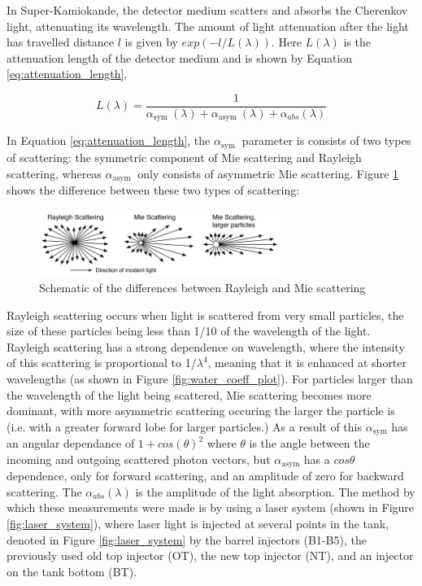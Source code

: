 In Super-Kamiokande, the detector medium scatters and absorbs the Cherenkov light, attenuating its wavelength. The amount of light attenuation after the light has travelled distance $l$ is given by $exp(-l/L(\lambda))$. Here $L(\lambda)$ is the attenuation length of the detector medium and is shown by Equation \ref{eq:attenuation_length}, 

\begin{equation}
L(\lambda)=\frac{1}{\alpha_{\text {sym }}(\lambda)+\alpha_{\text {asym }}(\lambda)+\alpha_{a b s}(\lambda)}
\label{eq:attenuation_length}
\end{equation}

In Equation \ref{eq:attenuation_length}, the $\alpha_{\text {sym }}$ parameter is consists of two types of scattering: the symmetric component of Mie scattering and Rayleigh scattering, whereas $\alpha_{\text {asym }}$ only consists of asymmetric Mie scattering.   Figure \ref{fig:rayleigh_mie} shows the difference between these two types of scattering:

\begin{figure}
    \centering
    \includegraphics[width=0.7\textwidth]{Figures/rayleigh_mie.png}
    \caption{Schematic of the differences between Rayleigh and Mie scattering}
    \label{fig:rayleigh_mie}
\end{figure}

Rayleigh scattering occurs when light is scattered from very small particles, the size of these particles being less than 1/10 of the wavelength of the light. Rayleigh scattering has a strong dependence on wavelength, where the intensity of this scattering is proportional to 1/$\lambda^{4}$, meaning that it is enhanced at shorter wavelengths (as shown in Figure \ref{fig:water_coeff_plot}). For particles larger than the wavelength of the light being scattered, Mie scattering becomes more dominant, with more asymmetric scattering occuring the larger the particle is (i.e. with a greater forward lobe for larger particles.) As a result of this $\alpha_{\text {sym}}$ has an angular dependance of $1 + cos(\theta)^2$ where $\theta$ is the angle between the incoming and outgoing scattered photon vectors, but $\alpha_{\text {asym}}$ has a $cos\theta$ dependence, only for forward scattering, and an amplitude of zero for backward scattering. The $\alpha_{abs}(\lambda)$ is the amplitude of the light absorption. The method by which these measurements were made is by using a laser system (shown in Figure \ref{fig:laser_system}),  where laser light is injected at several points in the tank, denoted in Figure \ref{fig:laser_system} by the barrel injectors (B1-B5), the previously used old top injector (OT), the new top injector (NT), and an injector on the tank bottom (BT). 

